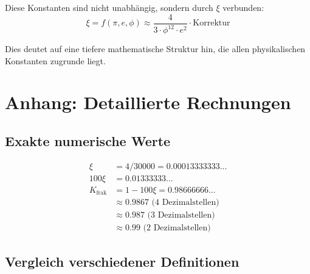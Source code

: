 	Diese Konstanten sind nicht unabhängig, sondern durch $\xi$ verbunden:
	\begin{equation}
		\xi = f(\pi, e, \phi) \approx \frac{4}{3 \cdot \phi^{12} \cdot e^2} \cdot \text{Korrektur}
	\end{equation}
	
	Dies deutet auf eine tiefere mathematische Struktur hin, die allen physikalischen Konstanten zugrunde liegt.
	
	\section{Anhang: Detaillierte Rechnungen}
	
	\subsection{Exakte numerische Werte}
	
	\begin{align}
		\xi &= 4/30000 = 0.00013333333... \\
		100\xi &= 0.01333333... \\
		K_{\text{frak}} &= 1 - 100\xi = 0.98666666... \\
		&\approx 0.9867 \text{ (4 Dezimalstellen)} \\
		&\approx 0.987 \text{ (3 Dezimalstellen)} \\
		&\approx 0.99 \text{ (2 Dezimalstellen)}
	\end{align}
	
	\subsection{Vergleich verschiedener Definitionen}
	
	\begin{table}[h]
		\centering
		\caption{Verschiedene mögliche Definitionen und ihre Werte}
	\end{table}
	
